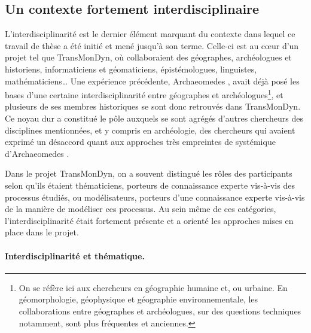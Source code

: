 \subsection{Un contexte fortement interdisciplinaire}

L'interdisciplinarité est le dernier élément marquant du contexte dans lequel ce travail de thèse a été initié et mené jusqu'à son terme.
Celle-ci est au cœur d'un projet tel que TransMonDyn, où collaboraient des géographes, archéologues et historiens, informaticiens et géomaticiens, épistémologues, linguistes, mathématiciens\ldots{}
Une expérience précédente, Archaeomedes \autocite{durand1998archaeomedes}, avait déjà posé les bases d'une certaine interdisciplinarité entre géographes et archéologues\footnote{
	On se réfère ici aux chercheurs en géographie humaine et, ou urbaine.
	En géomorphologie, géophysique et géographie environnementale, les collaborations entre géographes et archéologues, sur des questions techniques notamment, sont plus fréquentes et anciennes.
}, et plusieurs de ses membres historiques se sont donc retrouvés dans TransMonDyn.
Ce \og noyau dur\fg{} a constitué le pôle auxquels se sont agrégés d'autres chercheurs des disciplines mentionnées, et y compris en archéologie, des chercheurs qui avaient exprimé un désaccord quant aux approches très empreintes de systémique d'Archaeomedes \autocite[voir][par exemple]{ferdiere_modelisation_2000}.


Dans le projet TransMonDyn, on a souvent distingué les rôles des participants selon qu'ils étaient \og thématiciens\fg{}, porteurs de connaissance experte vis-à-vis des processus étudiés, ou \og modélisateurs\fg{}, porteurs d'une connaissance experte vis-à-vis de la manière de modéliser ces processus.
Au sein même de ces catégories, l'interdisciplinarité était fortement présente et a orienté les approches mises en place dans le projet.

\paragraph{Interdisciplinarité et thématique.}

